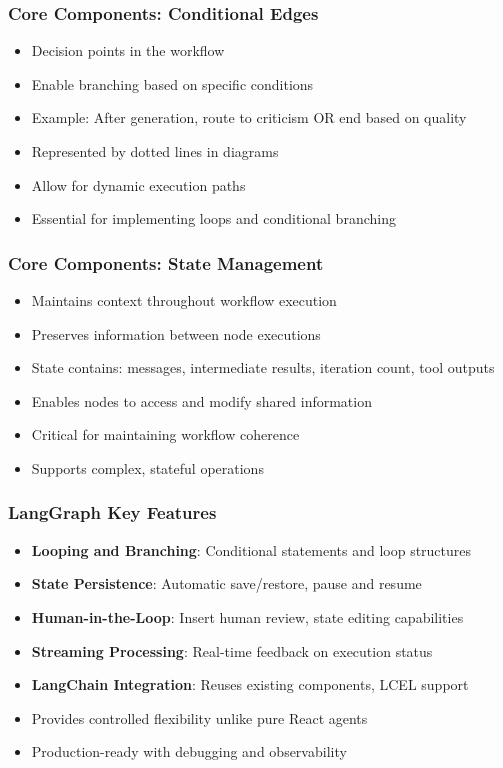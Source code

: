 \begin{frame}[fragile]\frametitle{Core Components: Conditional Edges}
      \begin{itemize}
        \item Decision points in the workflow
        \item Enable branching based on specific conditions
        \item Example: After generation, route to criticism OR end based on quality
        \item Represented by dotted lines in diagrams
        \item Allow for dynamic execution paths
        \item Essential for implementing loops and conditional branching
      \end{itemize}
\end{frame}

\begin{frame}[fragile]\frametitle{Core Components: State Management}
      \begin{itemize}
        \item Maintains context throughout workflow execution
        \item Preserves information between node executions
        \item State contains: messages, intermediate results, iteration count, tool outputs
        \item Enables nodes to access and modify shared information
        \item Critical for maintaining workflow coherence
        \item Supports complex, stateful operations
      \end{itemize}
\end{frame}


\begin{frame}[fragile]\frametitle{LangGraph Key Features}
      \begin{itemize}
        \item \textbf{Looping and Branching}: Conditional statements and loop structures
        \item \textbf{State Persistence}: Automatic save/restore, pause and resume
        \item \textbf{Human-in-the-Loop}: Insert human review, state editing capabilities
        \item \textbf{Streaming Processing}: Real-time feedback on execution status
        \item \textbf{LangChain Integration}: Reuses existing components, LCEL support
        \item Provides controlled flexibility unlike pure React agents
        \item Production-ready with debugging and observability
      \end{itemize}
\end{frame}



